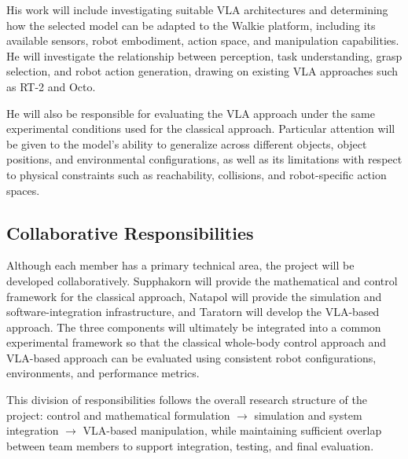 \documentclass[12pt,a4paper]{article}
\begin{document}
His work will include investigating suitable VLA architectures and determining how the
selected model can be adapted to the Walkie platform, including its available sensors, robot
embodiment, action space, and manipulation capabilities. He will investigate the relationship
between perception, task understanding, grasp selection, and robot action generation, drawing
on existing VLA approaches such as RT-2 and Octo.

He will also be responsible for evaluating the VLA approach under the same
experimental conditions used for the classical approach. Particular attention will be given to the
model's ability to generalize across different objects, object positions, and environmental
configurations, as well as its limitations with respect to physical constraints such as reachability,
collisions, and robot-specific action spaces.

\subsection*{Collaborative Responsibilities}

Although each member has a primary technical area, the project will be developed
collaboratively. Supphakorn will provide the mathematical and control framework for the
classical approach, Natapol will provide the simulation and software-integration infrastructure,
and Taratorn will develop the VLA-based approach. The three components will ultimately be
integrated into a common experimental framework so that the classical whole-body control
approach and VLA-based approach can be evaluated using consistent robot configurations,
environments, and performance metrics.

This division of responsibilities follows the overall research structure of the project:
control and mathematical formulation $\rightarrow$ simulation and system integration $\rightarrow$ VLA-based
manipulation, while maintaining sufficient overlap between team members to support
integration, testing, and final evaluation.

\newpage
{}
\end{document}
